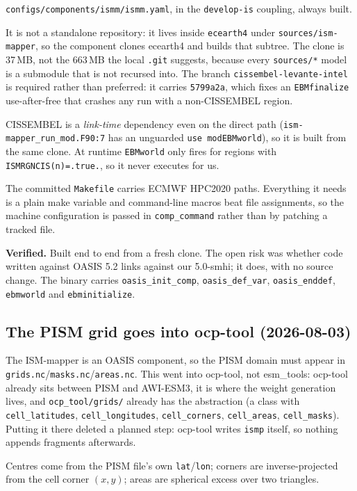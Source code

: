 \documentclass[11pt,a4paper]{article}
\newcommand{\code}[1]{\texttt{\small #1}}
\begin{document}
\code{configs/components/ismm/ismm.yaml}, in the \code{develop-is} coupling, always built.

It is not a standalone repository: it lives inside \code{ecearth4} under
\code{sources/ism-mapper}, so the component clones ecearth4 and builds that subtree. The clone is
37\,MB, not the 663\,MB the local \code{.git} suggests, because every \code{sources/*} model is a
submodule that is not recursed into. The branch \code{cissembel-levante-intel} is required rather
than preferred: it carries \code{5799a2a}, which fixes an \code{EBMfinalize} use-after-free that
crashes any run with a non-CISSEMBEL region.

CISSEMBEL is a \emph{link-time} dependency even on the direct path
(\code{ism-mapper\_run\_mod.F90:7} has an unguarded \code{use modEBMworld}), so it is built from
the same clone. At runtime \code{EBMworld} only fires for regions with
\code{ISMRGNCIS(n)=.true.}, so it never executes for us.

The committed \code{Makefile} carries ECMWF HPC2020 paths. Everything it needs is a plain make
variable and command-line macros beat file assignments, so the machine configuration is passed in
\code{comp\_command} rather than by patching a tracked file.

\medskip\noindent
\textbf{Verified.} Built end to end from a fresh clone. The open risk was whether code written
against OASIS 5.2 links against our 5.0-smhi; it does, with no source change. The binary carries
\code{oasis\_init\_comp}, \code{oasis\_def\_var}, \code{oasis\_enddef}, \code{ebmworld} and
\code{ebminitialize}.

\subsection{The PISM grid goes into ocp-tool (2026-08-03)}
\label{sec:grid}

The ISM-mapper is an OASIS component, so the PISM domain must appear in
\code{grids.nc}/\code{masks.nc}/\code{areas.nc}. This went into ocp-tool, not esm\_tools: ocp-tool
already sits between PISM and AWI-ESM3, it is where the weight generation lives, and
\code{ocp\_tool/grids/} already has the abstraction (a class with \code{cell\_latitudes},
\code{cell\_longitudes}, \code{cell\_corners}, \code{cell\_areas}, \code{cell\_masks}). Putting it
there deleted a planned step: ocp-tool writes \code{ismp} itself, so nothing appends fragments
afterwards.

Centres come from the PISM file's own \code{lat}/\code{lon}; corners are inverse-projected from the
cell corner $(x,y)$; areas are spherical excess over two triangles.
\end{document}
